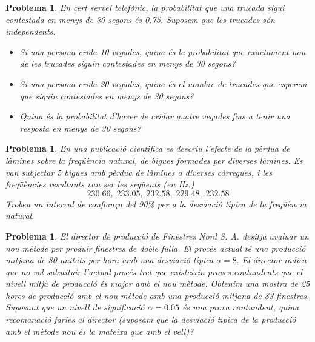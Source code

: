 \documentclass[a4paper,10pt]{article}
\newcounter{prbcont}
\newtheorem{problema}[prbcont]{Problema}
\begin{document}
\begin{problema}
En cert servei telef\`onic, la probabilitat que una trucada sigui contestada en menys de 30 segons \'es 0.75. Suposem que les trucades s\'on independents.
\begin{itemize}
\item [a)] Si una persona crida 10 vegades, quina \'es la probabilitat que exactament nou de les trucades siguin contestades en menys de 30 segons?
\item [b)] Si una persona crida 20 vegades, quina \'es el nombre de trucades que esperem que siguin contestades en menys de 30 segons?
\item [c)] Quina \'es la probabilitat d'haver de cridar quatre vegades fins a tenir una resposta en menys de 30 segons?
\end{itemize}
\end{problema}


\begin{problema}
En una publicaci\'o cient\'{\i}fica es descriu l'efecte de la p\`erdua de l\`amines sobre la freq\"u\`encia natural, de bigues formades per diverses l\`amines. Es van subjectar 5 bigues amb p\`erdua de l\`amines a diverses c\`arregues, i les freq\"u\`encies resultants van ser les seg\"uents (en Hz.)
\[
230.66,\;233.05,\;232.58,\;229.48,\; 232.58
\]
Trobeu un interval de confian\c{c}a del 90\% per a la desviaci\'o t\'{\i}pica de la freq\"u\`encia natural.
\end{problema}


\begin{problema}
El director de producci\'o de Finestres Nord S. A. desitja avaluar un nou m\`etode per produir finestres de doble fulla. El proc\'es actual t\'e una producci\'o mitjana de 80 unitats per hora amb una desviaci\'o t\'{\i}pica $\sigma=8.$ El director indica que no vol substituir l'actual proc\'es tret que existeixin proves contundents que el nivell mitj\`a de producci\'o \'es major amb el nou m\`etode. Obtenim una mostra de 25 hores de producci\'o amb el nou m\`etode amb una producci\'o mitjana de 83 finestres. Suposant que un nivell de significaci\'o $\alpha=0.05$ \'es una prova contundent, quina recomanaci\'o faries al director (suposam que la desviaci\'o t\'{\i}pica de la producci\'o amb el m\`etode nou
\'es la mateixa que amb el vell)?
\end{problema}
\end{document}
